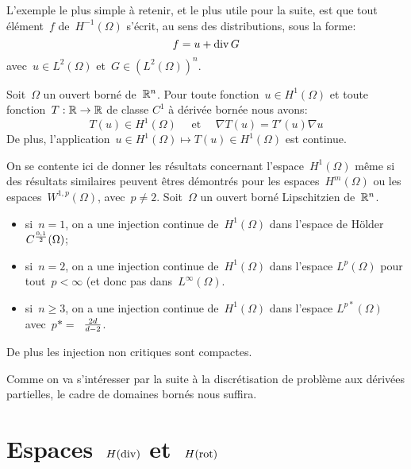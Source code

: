 \bigskip
L'exemple le plus simple à retenir, et le plus utile pour la suite, est que tout élément~$f$ de~$H^{-1}(\Omega)$ s'écrit, au sens des distributions, sous la forme:
\begin{equation}\colorred
f = u + \dive G
\end{equation}
avec~$u \in L^2(\Omega)$ et~$G \in (L^2(\Omega))^n$.
\medskip
\begin{theoreme}
Soit~$\Omega$ un ouvert borné de~$\mathbb R^n$.
Pour toute fonction~$u \in H^1(\Omega)$ et toute fonction~$T: \mathbb R \to \mathbb R$ de classe $C^1$ à dérivée bornée nous avons:
\begin{equation}
T(u) \in H^1(\Omega)\quad\text{ et }\quad\nabla T(u) = T'(u)\nabla u
\end{equation}
De plus, l'application~$u \in H^1(\Omega) \mapsto T(u) \in H^1(\Omega)$ est continue.
\end{theoreme}
\medskip
On se contente ici de donner les résultats concernant l'espace~$H^1(\Omega)$ même si des résultats similaires peuvent êtres démontrés pour les espaces~$H^m(\Omega)$ ou les espaces~$W^{1,p}(\Omega)$, avec~$p\ne 2$.
Soit~$\Omega$ un ouvert borné Lipschitzien de~$\mathbb R^n$.
\begin{itemize}
  \item si~$n=1$, on a une injection continue de~$H^1(\Omega)$ dans l'espace de Hölder~$C^{0,1\over2}(\Omega)$;
  \item si~$n=2$, on a une injection continue de~$H^1(\Omega)$ dans l'espace $L^p(\Omega)$ pour tout~$p<\infty$ (et donc pas dans~$L^\infty(\Omega)$.
  \item si~$n\ge 3$, on a une injection continue de~$H^1(\Omega)$ dans l'espace $L^{p*}(\Omega)$ avec~$p*=$~${2d}\over{d-2}$.
\end{itemize}
De plus les injection non critiques sont compactes.

Comme on va s'intéresser par la suite à la discrétisation de problème aux dérivées partielles, le cadre de domaines bornés nous suffira.

\medskip
\section{Espaces~$H(\operatorname{div})$ et~$H(\operatorname{rot})$}

